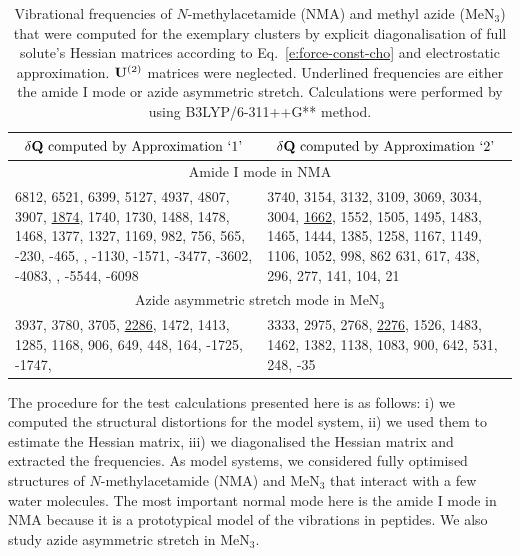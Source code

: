 \documentclass[b5paper,oneside,fleqn,11pt]{book}
\begin{document}
\begin{refsection}
%
\begin{longtable}{p{} | p{}}
\caption{
Vibrational frequencies of $N$-methylacetamide (NMA) and methyl azide (MeN$_3$)
that were computed for the exemplary clusters by explicit diagonalisation
of full solute's Hessian matrices according to Eq.~\eqref{e:force-const-cho} 
and electrostatic
approximation. ${\bf U}^{(2)}$ matrices were neglected. Underlined
frequencies are either the amide I mode or azide asymmetric stretch.
Calculations were performed by using B3LYP/6-311++G** method.
\label{t:NMA.MeNNN.dq.freq}}
\\\hline\hline
\multicolumn{1}{c}{$\delta {\bf Q} {\text{ computed by Approximation `1'}}$} & 
\multicolumn{1}{c}{$\delta {\bf Q} {\text{ computed by Approximation `2'}}$} \\
\hline
\multicolumn{2}{c}{Amide I mode in NMA} \\
6812, 6521, 6399, 5127, 4937, 4807, 3907, \underline{1874}, 1740, 1730, 1488, 1478,
1468, 1377, 1327, 1169, 982, 756, 565, -230, -465, \newline -1059, -1130, -1571, -3477,
-3602, -4083, \newline -5442, -5544, -6098 & 
3740, 3154, 3132, 3109, 3069, 3034, 3004, \underline{1662}, 1552, 1505, 1495,
1483, 1465, 1444, 1385, 1258, 1167, 1149, 1106, 1052, 998,  862
631, 617, 438, 296, 277, 141, 104, 21 \\
\hline
\multicolumn{2}{c}{Azide asymmetric stretch mode in MeN$_3$} \\
3937, 3780, 3705, \underline{2286}, 1472, 1413, 1285, 1168, 906, 649,
448, 164, -1725, -1747, \newline -2308 &
3333, 2975, 2768, \underline{2276}, 1526, 1483, 1462, 1382, 1138, 1083,
900, 642, 531, 248, -35 \\
\hline\hline
\end{longtable}
%
The procedure for the test calculations presented here is as follows: i) 
we computed the structural distortions for the model system, ii) we used them to estimate
the Hessian matrix, iii) we diagonalised the Hessian matrix and extracted the frequencies.
As model systems, we considered fully optimised structures of $N$-methylacetamide (NMA) 
and MeN$_3$ 
that interact with a few water molecules.
The most important normal mode here is the amide I mode in NMA
because it is a prototypical model of the vibrations in peptides.
We also study azide asymmetric
stretch in MeN$_3$.


\end{refsection}
\end{document}
